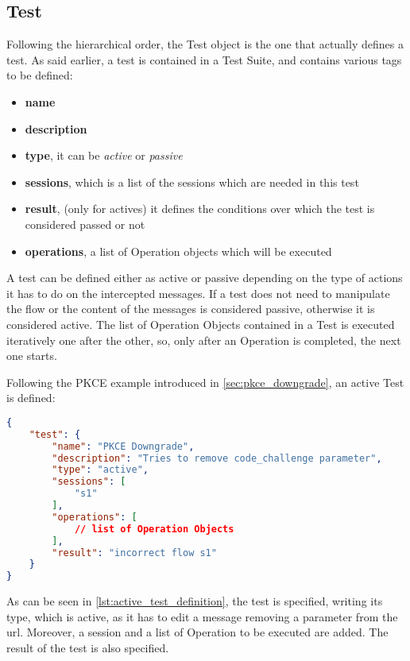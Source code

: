 \subsection{Test}
Following the hierarchical order, the Test object is the one that actually defines a test. As said earlier, a test is contained in a Test Suite, and contains various tags to be defined:
\begin{itemize}
    \item \textbf{name}
    \item \textbf{description}
    \item \textbf{type}, it can be \textit{active} or \textit{passive}
    \item \textbf{sessions}, which is a list of the sessions which are needed in this test
    \item \textbf{result}, (only for actives) it defines the conditions over which the test is considered passed or not
    \item \textbf{operations}, a list of Operation objects which will be executed
\end{itemize}
A test can be defined either as active or passive depending on the type of actions it has to do on the intercepted messages. If a test does not need to manipulate the flow or the content of the messages is considered passive, otherwise it is considered active.
The list of Operation Objects contained in a Test is executed iteratively one after the other, so, only after an Operation is completed, the next one starts.

Following the \gls{PKCE} example introduced in \ref{sec:pkce_downgrade}, an active Test is defined:

\begin{lstlisting}[language=json, caption=Active test definition, label={lst:active_test_definition}]
{
    "test": {
        "name": "PKCE Downgrade",
        "description": "Tries to remove code_challenge parameter",
        "type": "active",
        "sessions": [
            "s1"
        ],
        "operations": [
            // list of Operation Objects
        ],
        "result": "incorrect flow s1"
    }
}    
\end{lstlisting}

As can be seen in \ref{lst:active_test_definition}, the test is specified, writing its type, which is active, as it has to edit a message removing a parameter from the url. Moreover, a session and a list of Operation to be executed are added. The result of the test is also specified.

